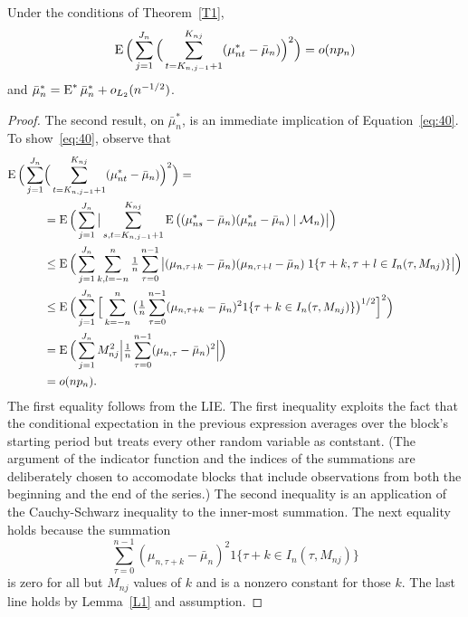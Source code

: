 \documentclass[11pt]{article}
\begin{document}
\begin{lem}\label{L3}
Under the conditions of Theorem~\ref{T1},
\begin{equation}\label{eq:40}
  \operatorname{E} \Big(\sum_{j=1}^{J_n} \Big( \sum_{t = K_{n,j-1}+1}^{K_{nj}}
  (\mu_{nt}^{*} - \bar \mu_n)\Big)^2\Big) = o(n p_n)
\end{equation}
and $\bar \mu_n^{*} = \operatorname{E}^{*} \bar \mu_n^{*} + o_{L_2}(n^{-1/2})$.
\end{lem}
\begin{proof}
  The second result, on $\bar\mu_n^*$, is an immediate implication of
  Equation~\eqref{eq:40}. To show~\eqref{eq:40}, observe that
  \begin{align*}
    \operatorname{E} \Big(\sum_{j=1}^{J_n} &\Big( \sum_{t= K_{n,j-1} +1}^{K_{nj}}
    (\mu_{nt}^{*} - \bar \mu_n)\Big)^2\Big)= \\
    &= \operatorname{E}\Big(\sum_{j=1}^{J_n} \big\lvert \sum_{s,t = K_{n,j-1}+1}^{K_{nj}}
    \operatorname{E} \big((\mu_{ns}^{*} - \bar{\mu}_n)
    (\mu_{nt}^{*} - \bar{\mu}_n) \mid \mathcal{M}_n \big) \big\rvert \Big)\\
    &\leq \operatorname{E}\Big( \sum_{j=1}^{J_n}
    \sum_{k,l = -n}^{n} \tfrac{1}{n} \sum_{\tau=0}^{n-1} \big\lvert
    (\mu_{n,\tau+k} - \bar{\mu}_n) (\mu_{n,\tau+l} - \bar{\mu}_n) \;
    1\{ \tau + k, \tau + l \in I_n(\tau, M_{nj})\} \big\rvert \Big)\\
    &\leq \operatorname{E}\Big(\sum_{j=1}^{J_n} \Big[
    \sum_{k = -n}^{n} \big(\tfrac{1}{n} \sum_{\tau=0}^{n-1}
    (\mu_{n,\tau+k} - \bar{\mu}_n)^2
    1\{ \tau + k \in I_n(\tau, M_{nj})\}\big)^{1/2}\Big]^{2}\Big)\\
    &= \operatorname{E}\Big(\sum_{j=1}^{J_n}
    M_{nj}^2 \Big\lvert \tfrac{1}{n} \sum_{\tau=0}^{n-1}
    (\mu_{n,\tau} - \bar{\mu}_n)^2 \Big\lvert\Big)\\
    &= o(n p_n).
  \end{align*}
  The first equality follows from the LIE. The first inequality
  exploits the fact that the conditional expectation in the previous
  expression averages over the block's starting period but treats
  every other random variable as contstant. (The argument of the
  indicator function and the indices of the summations are
  deliberately chosen to accomodate blocks that include observations
  from both the beginning and the end of the series.) The second
  inequality is an application of the Cauchy-Schwarz inequality to the
  inner-most summation. The next equality holds because the
  summation
  \[
    \sum_{\tau=0}^{n-1} (\mu_{n,\tau+k} - \bar{\mu}_n)^2
    1\{ \tau + k \in I_n(\tau, M_{nj})\}
  \]
  is zero for all but $M_{nj}$ values of $k$ and is a nonzero constant
  for those $k$. The last line holds by Lemma~\ref{L1} and assumption.
\end{proof}
\end{document}
